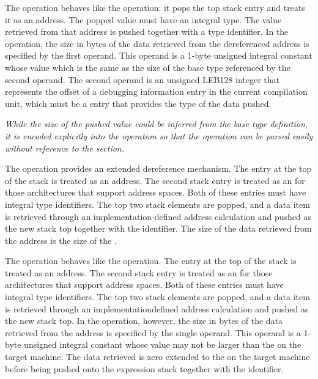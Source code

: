 \begin{enumerate}[1. ]
\itembfnl{\DWOPdereftypeTARG}
The \DWOPdereftypeNAME{} operation behaves like the \DWOPderefsize{} operation:
it pops the top stack entry and treats it as an address. 
The popped value must have an integral type.
The value retrieved from that address is pushed together with a type identifier. 
In the \DWOPdereftypeNAME{} operation, the size in
bytes of the data retrieved from the dereferenced address is specified by
the first operand. This operand is a 1-byte unsigned integral constant whose
value which is the same as the size of the base type referenced
by the second operand.
The second operand is an unsigned LEB128 integer that
represents the offset of a debugging information entry in the current
compilation unit, which must be a \DWTAGbasetype{} entry that provides the
type of the data pushed.

\textit{While the size of the pushed value could be inferred from the base 
type definition, it is encoded explicitly into the operation so that the
operation can be parsed easily without reference to the \dotdebuginfo{}
section.}

\itembfnl{\DWOPxderefTARG}
The \DWOPxderefNAME{} operation provides an extended dereference
mechanism. The entry at the top of the stack is treated as an
address. The second stack entry is treated as an  for those architectures that support
address spaces. 
Both of these entries must have integral type identifiers.
The top two stack elements are popped,
and a data item is retrieved through an implementation-defined
address calculation and pushed as the new stack top together with the
\generictype{} identifier.
The size of the data retrieved from the 
address is the size of the \generictype.

\itembfnl{\DWOPxderefsizeTARG}
The \DWOPxderefsizeNAME{} operation behaves like the
\DWOPxderef{} operation. The entry at the top of the stack is
treated as an address. The second stack entry is treated as
an  for those architectures
that support 
address spaces. 
Both of these entries must have integral type identifiers.
The top two stack
elements are popped, and a data item is retrieved through an
implementation\dash defined address calculation and pushed as the
new stack top. In the \DWOPxderefsizeNAME{} operation, however,
the size in bytes of the data retrieved from the 
address is specified by the single operand. This operand is a
1-byte unsigned integral constant whose value may not be larger
than the  on the target machine. The data
retrieved is zero extended to the  on the
target machine before being pushed onto the expression stack together
with the \generictype{} identifier.


\end{enumerate}
